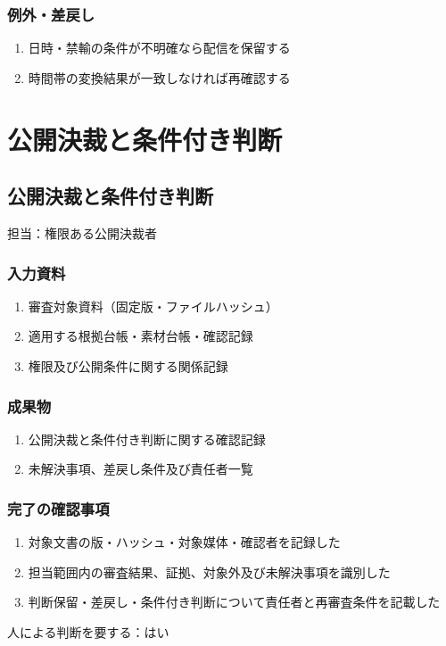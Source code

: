 \documentclass[a4paper,11pt]{article}
\begin{document}
\subsubsection*{例外・差戻し}
\begin{enumerate}[leftmargin=2em,itemsep=0.35em]
\item 日時・禁輸の条件が不明確なら配信を保留する
\item 時間帯の変換結果が一致しなければ再確認する
\end{enumerate}
\section{公開決裁と条件付き判断}
\subsection{公開決裁と条件付き判断}
\par 担当：権限ある公開決裁者\par\medskip
\subsubsection*{入力資料}
\begin{enumerate}[leftmargin=2em,itemsep=0.35em]
\item 審査対象資料（固定版・ファイルハッシュ）
\item 適用する根拠台帳・素材台帳・確認記録
\item 権限及び公開条件に関する関係記録
\end{enumerate}
\subsubsection*{成果物}
\begin{enumerate}[leftmargin=2em,itemsep=0.35em]
\item 公開決裁と条件付き判断に関する確認記録
\item 未解決事項、差戻し条件及び責任者一覧
\end{enumerate}
\subsubsection*{完了の確認事項}
\begin{enumerate}[leftmargin=2em,itemsep=0.35em]
\item 対象文書の版・ハッシュ・対象媒体・確認者を記録した
\item 担当範囲内の審査結果、証拠、対象外及び未解決事項を識別した
\item 判断保留・差戻し・条件付き判断について責任者と再審査条件を記載した
\end{enumerate}
\par 人による判断を要する：はい\par\medskip
\end{document}
